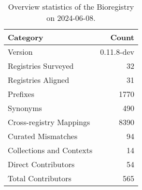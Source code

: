 \begin{table}
\caption{Overview statistics of the Bioregistry on 2024-06-08.}
\label{tab:bioregistry-summary}
\begin{tabular}{lr}
\toprule
Category & Count \\
\midrule
Version & 0.11.8-dev \\
Registries Surveyed & 32 \\
Registries Aligned & 31 \\
Prefixes & 1770 \\
Synonyms & 490 \\
Cross-registry Mappings & 8390 \\
Curated Mismatches & 94 \\
Collections and Contexts & 14 \\
Direct Contributors & 54 \\
Total Contributors & 565 \\
\bottomrule
\end{tabular}
\end{table}
